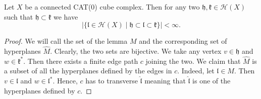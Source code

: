 \begin{lemma}
  \label{lem:finite-interval}
  Let \(X\) be a connected CAT(0) cube complex. Then for any two \(\mathfrak{h,k} \in \mathcal{H}(X)\) such that \(\mathfrak{h} \subset \mathfrak{k}\) we have
  \[
    |\{\mathfrak{l} \in \mathcal{H}(X) \mid \mathfrak{h} \subset \mathfrak{l} \subset \mathfrak{k}\}| < \infty.
  \]
\end{lemma}

\begin{proof}
  We will call the set of the lemma \(M\) and the corresponding set of hyperplanes \(\hat M\). Clearly, the two sets are bijective. We take any vertex \(v \in \mathfrak{h}\)  and \(w \in \mathfrak{k}^\ast\). Then there exists a finite edge path \(c\) joining the two. We claim that \(\hat M\) is a subset of all the hyperplanes defined by the edges in \(c\). Indeed, let \(\mathfrak{l} \in M\). Then \(v \in \mathfrak{l}\) and \(w \in \mathfrak{l}^\ast\). Hence, \(c\) has to transverse \(\mathfrak{\hat l}\) meaning that \(\mathfrak{\hat l}\) is one of the hyperplanes defined by \(c\).
\end{proof}

